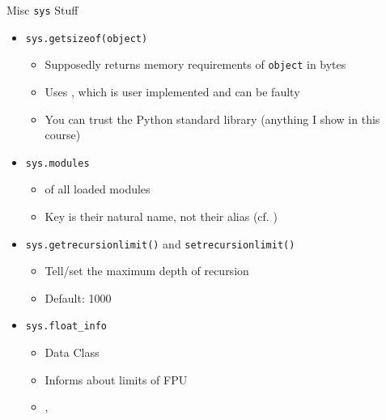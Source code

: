 
\begin{frame}{Misc \texttt{sys} Stuff}
%
\begin{itemize}
\item \texttt{sys.getsizeof(object)}
	\begin{itemize}
	\item Supposedly returns memory requirements of \texttt{object} in bytes
	\item Uses , which is user implemented and can be faulty
	\item You can trust the Python standard library (anything I show in this course)
	\end{itemize}
\item \texttt{sys.modules}
	\begin{itemize}
	\item {} of all loaded modules
	\item Key is their natural name, not their alias (cf. )
	\end{itemize}
\item \texttt{sys.getrecursionlimit()} and \texttt{setrecursionlimit()}
	\begin{itemize}
	\item Tell/set the maximum depth of recursion
	\item Default: 1000
	\end{itemize}
\item \texttt{sys.float\_info}
	\begin{itemize}
	\item Data Class
	\item Informs about limits of FPU
	\item {}, 
	\end{itemize}
\end{itemize}
%
\end{frame}



